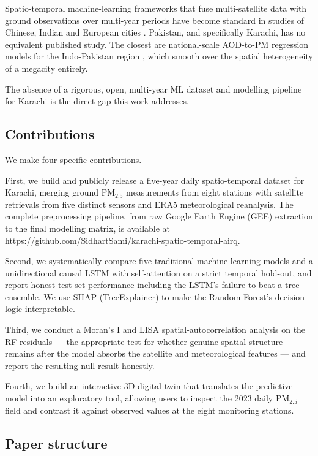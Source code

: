 \documentclass{iopjournal}
\begin{document}
Spatio-temporal machine-learning frameworks that fuse multi-satellite
data with ground observations over multi-year periods have become
standard in studies of Chinese, Indian and European cities
\cite{Chen2021, Brokamp2018, Stafoggia2019}. Pakistan, and specifically
Karachi, has no equivalent published study. The closest are
national-scale AOD-to-PM regression models for the Indo-Pakistan
region \cite{Gupta2006, Koelemeijer2006}, which smooth over the
spatial heterogeneity of a megacity entirely.

The absence of a rigorous, open, multi-year ML dataset and modelling
pipeline for Karachi is the direct gap this work addresses.

\subsection{Contributions}

We make four specific contributions.

First, we build and publicly release a five-year daily
spatio-temporal dataset for Karachi, merging ground PM$_{2.5}$
measurements from eight stations with satellite retrievals from five
distinct sensors and ERA5 meteorological reanalysis. The complete
preprocessing pipeline, from raw Google Earth Engine (GEE) extraction
to the final modelling matrix, is available at
\url{https://github.com/SidhartSami/karachi-spatio-temporal-airq}.

Second, we systematically compare five traditional machine-learning
models and a unidirectional causal LSTM with self-attention on a
strict temporal hold-out, and report honest test-set performance
including the LSTM's failure to beat a tree ensemble. We use SHAP
(TreeExplainer) to make the Random Forest's decision logic
interpretable.

Third, we conduct a Moran's I and LISA spatial-autocorrelation
analysis on the RF residuals --- the appropriate test for whether
genuine spatial structure remains after the model absorbs the
satellite and meteorological features --- and report the resulting
null result honestly.

Fourth, we build an interactive 3D digital twin that translates the
predictive model into an exploratory tool, allowing users to inspect
the 2023 daily PM$_{2.5}$ field and contrast it against observed
values at the eight monitoring stations.

\subsection{Paper structure}
\end{document}
